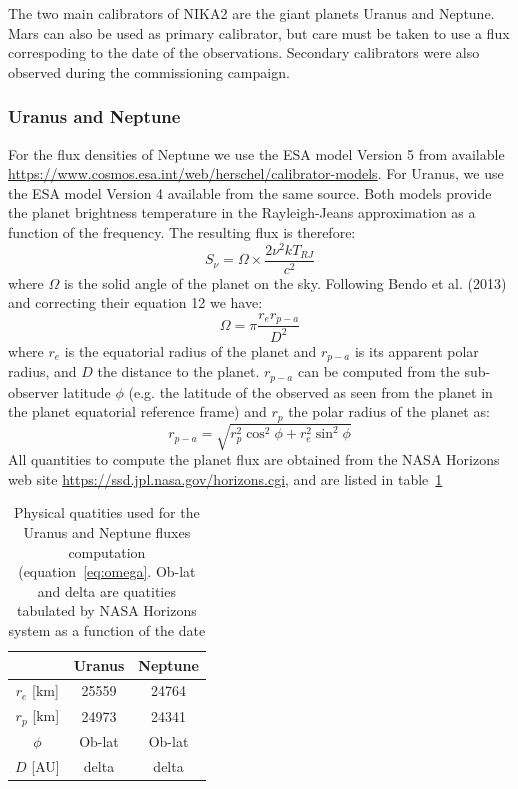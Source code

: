 The two main calibrators of NIKA2 are the giant planets Uranus and
Neptune. Mars can also be used as primary calibrator, but care must be
taken to use a flux correspoding to the date of the
observations. Secondary calibrators were also observed during the
commissioning campaign. 

\subsubsection{Uranus and Neptune}
For the flux densities of Neptune we use the ESA model Version 5 from
available  \url{https://www.cosmos.esa.int/web/herschel/calibrator-models}. For
Uranus, we use the ESA model Version 4 available from the same
source.  Both models provide the planet brightness temperature in the
Rayleigh-Jeans approximation as a function of the frequency. The
resulting flux is therefore: 
\begin{equation}
S_{\nu} = \Omega \times \frac{2 \nu^{2} k T_{RJ}}{c^2}
\end{equation}
where $\Omega$ is the solid angle of the planet on the sky. Following
Bendo et al. (2013) and correcting their equation 12 we have:
\begin{equation}
\Omega = \pi \frac{r_{e} r_{p-a}}{D^{2}} 
\label{eq:omega}
\end{equation}
where $r_{e}$ is the equatorial radius of the planet and $r_{p-a}$ is
its apparent polar radius, and $D$ the distance to the
planet. $r_{p-a}$ can be computed from the sub-observer latitude $\phi$
(e.g. the latitude of the observed as seen from the planet in the
planet equatorial reference frame) and $r_{p}$ the polar radius of the
planet as:
\begin{equation}
r_{p-a} = \sqrt{r_{p}^2 \cos^{2}\phi + r_{e}^2 \sin^{2} \phi}
\end{equation}
All quantities to compute the planet flux are obtained from the NASA
Horizons web site \url{https://ssd.jpl.nasa.gov/horizons.cgi}, and are
listed in table~\ref{tab:planetphysparam}

\begin{table}
\begin{center}
\begin{tabular}{|c|c|c|}
\hline
     & Uranus & Neptune \\
\hline
$r_{e}$ [km]  & 25559 & 24764 \\ 
\hline
$r_{p}$ [km]  & 24973 & 24341  \\
\hline
$\phi$         & Ob-lat & Ob-lat \\
\hline
$D$   [AU]    & delta   & delta \\
\hline
\end{tabular}
\end{center}
\caption{Physical quatities used for the Uranus and Neptune fluxes
  computation (equation~\ref{eq:omega}. Ob-lat and delta are quatities tabulated by NASA
  Horizons system as a function of the date}
\label{tab:planetphysparam}
\end{table}

